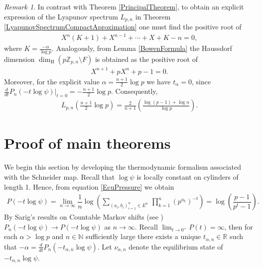 \documentclass[11pt]{amsart}
\theoremstyle{remark}
\newtheorem{remark}[theorem]{Remark}
\numberwithin{equation}{section}
\newcommand{\N}{\mathbb{N}}
\newcommand{\R}{\mathbb{R}}
\newcommand{\Z}{\mathbb{Z}}
\begin{document}
\begin{remark}
    In contrast with Theorem \ref{PrincipalTheorem}, to obtain an explicit expression of the Lyapunov spectrum $L_{p,n}$ in Theorem \ref{LyapunovSpectrumCompactAproximation} one must find the positive root of 
    \begin{align*}
        X^{n}(K+1)+X^{n-1}+\cdots +X+K-n=0,
    \end{align*} where $K=\frac{-\alpha}{\log p}$. Analogously, from Lemma \ref{BowenFormula} the Haussdorf dimension $\dim_{\mathrm H}\left(p\Z_{p,n}\setminus F\right)$ is obtained as the positive root of 
    \begin{align*}
        X^{n+1}+pX^{n}+p-1=0.
    \end{align*} Moreover, for the explicit value $\alpha=\frac{n+1}{2}\log p$ we have $t_{\alpha}=0$, since $\frac{d}{dt}P_{n}(-t\log \psi )|_{t=0}=-\frac{n+1}{2}\log p$. Consequently, 
    \begin{align*}
        L_{p,n}\left(\frac{n+1}{2}\log p\right)=\frac{2}{n+1}\left(\frac{\log(p-1)+\log n}{\log p}\right).
    \end{align*}
\end{remark}

\section{Proof of main theorems}

 We begin this section by developing the thermodynamic formalism associated with the Schneider map. Recall that $\log \psi $ is locally constant on cylinders of length 1. Hence, from equation \eqref{EcuPressure} we obtain 
\begin{align}\label{TopPressureSarig}
    P\left(-t\log \psi\right)=\lim_{n\rightarrow \infty}\dfrac{1}{n}\log\left(\sum_{(a_i,b_i)_{i=1}^{n}\in E^n} \, \prod_{k=1}^{n}(p^{a_{k}})^{-t}\right)=\log\left(\dfrac{p-1}{p^{t}-1}\right).
\end{align}
By Sarig's results on Countable Markov shifts (see \cite{sa2}) $P_{n}(-t\log \psi)\to P(-t\log \psi)$ as $n \to \infty$. Recall $\lim_{t\to 0^{+}}P(t)=\infty$, then for each $\alpha> \log p$ and $n\in \N$ sufficiently large there exists a unique $t_{\alpha,n}\in \R$ such that $-\alpha=\frac{d}{dt}P_{n}(-t_{\alpha,n}\log \psi)$. Let $\nu_{\alpha,n}$ denote the equilibrium state of $-t_{\alpha,n}\log\psi$. 
\end{document}
